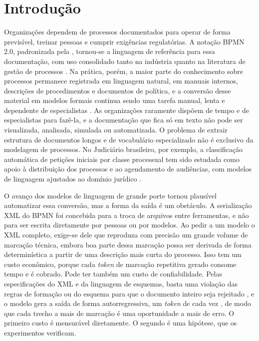 \chapter{Introdução}
\label{cap:introducao}

Organizações dependem de processos documentados para operar de forma previsível, treinar pessoas e cumprir exigências regulatórias. A notação BPMN 2.0, padronizada pela , tornou-se a linguagem de referência para essa documentação, com uso consolidado tanto na indústria quanto na literatura de gestão de processos \cite{weske2019business, dumas2018fundamentals}. Na prática, porém, a maior parte do conhecimento sobre processos permanece registrada em linguagem natural, em manuais internos, descrições de procedimentos e documentos de política, e a conversão desse material em modelos formais continua sendo uma tarefa manual, lenta e dependente de especialistas \cite{friedrich2011process, vanderaa2018challenges}. As organizações raramente dispõem de tempo e de especialistas para fazê-la, e a documentação que fica só em texto não pode ser visualizada, analisada, simulada ou automatizada. O problema de extrair estrutura de documentos longos e de vocabulário especializado não é exclusivo da modelagem de processos. No Judiciário brasileiro, por exemplo, a classificação automática de petições iniciais por classe processual tem sido estudada como apoio à distribuição dos processos e ao agendamento de audiências, com modelos de linguagem ajustados ao domínio jurídico \cite{aguiar2021text, aguiar2022topic}.

O avanço dos modelos de linguagem de grande porte \cite{vaswani2017attention, brown2020language} tornou plausível automatizar essa conversão, mas a forma da saída é um obstáculo. A serialização XML do BPMN foi concebida para a troca de arquivos entre ferramentas, e não para ser escrita diretamente por pessoas ou por modelos. Ao pedir a um modelo o XML completo, exige-se dele que reproduza com precisão um grande volume de marcação técnica, embora boa parte dessa marcação possa ser derivada de forma determinística a partir de uma descrição mais curta do processo. Isso tem um custo econômico, porque cada \textit{token} de marcação repetitiva gerado consome tempo e é cobrado. Pode ter também um custo de confiabilidade. Pelas especificações do XML e da linguagem de esquemas, basta uma violação das regras de formação ou do esquema para que o documento inteiro seja rejeitado \cite{bray2008xml, thompson2004xmlschema}, e o modelo gera a saída de forma autorregressiva, um \textit{token} de cada vez \cite{brown2020language}, de modo que cada trecho a mais de marcação é uma oportunidade a mais de erro. O primeiro custo é mensurável diretamente. O segundo é uma hipótese, que os experimentos verificam.

